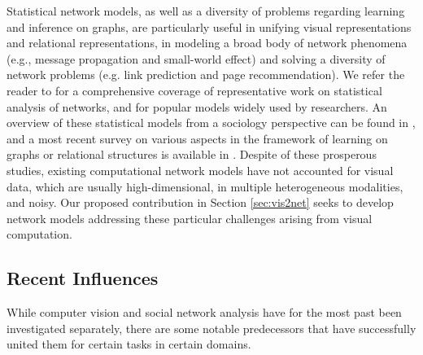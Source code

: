 Statistical network models, as well as a diversity of problems regarding learning and inference on graphs, are particularly useful in unifying visual representations and relational representations, in modeling a broad body of network phenomena (e.g., message propagation and small-world effect) and solving a diversity of network problems (e.g. link prediction and page recommendation). We refer the reader to \cite{Kolacyzk} for a comprehensive coverage of representative work on statistical analysis of networks, and \cite{Goldenberg} for popular models widely used by researchers. An overview of these statistical models from a sociology perspective can be found in \cite{Snijders}, and a most recent survey on various aspects in the framework of learning on graphs or relational structures is available in \cite{Rossi}. Despite of these prosperous studies, existing computational network models have not accounted for visual data, which are usually high-dimensional, in multiple heterogeneous modalities, and noisy. Our proposed contribution in Section \ref{sec:vis2net} seeks to develop network models addressing these particular challenges arising from visual computation.



\subsection{Recent Influences}

While computer vision and social network analysis have for the most past been investigated separately, there are some notable predecessors that have successfully united them for certain tasks in certain domains.

